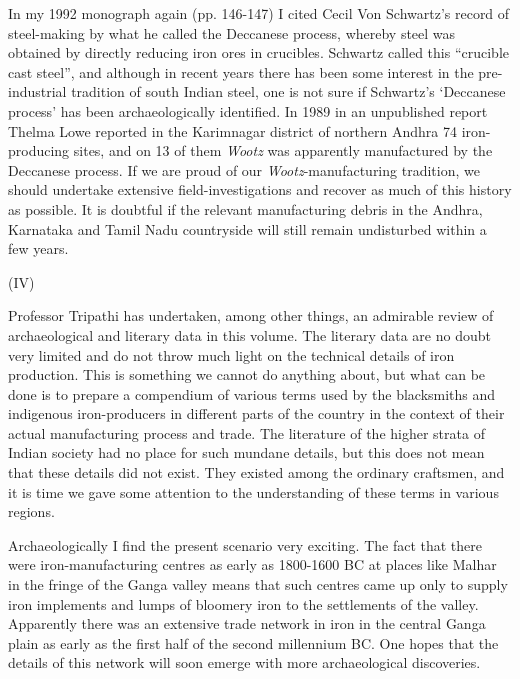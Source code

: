 In my 1992 monograph again (pp. 146-147) I cited Cecil Von Schwartz's record of steel-making by what he called the Deccanese process, whereby steel was obtained by directly reducing iron ores in crucibles. Schwartz called this ``crucible cast steel'', and although in recent years there has been some interest in the pre-industrial tradition of south Indian steel, one is not sure if Schwartz's `Deccanese process' has been archaeologically identified. In 1989 in an unpublished report Thelma Lowe reported in the Karimnagar district of northern Andhra 74 iron-producing sites, and on 13 of them \textit{Wootz} was apparently manufactured by the Deccanese process. If we are proud of our \textit{Wootz}-manufacturing tradition, we should undertake extensive field-investigations and recover as much of this history as possible. It is doubtful if the relevant manufacturing debris in the Andhra, Karnataka and Tamil Nadu countryside will still remain undisturbed within a few years.

\begin{center}
(IV)
\end{center}

Professor Tripathi has undertaken, among other things, an admirable review of archaeological and literary data in this volume. The literary data are no doubt very limited and do not throw much light on the technical details of iron production. This is something we cannot do anything about, but what can be done is to prepare a compendium of various terms used by the blacksmiths and indigenous iron-producers in different parts of the country in the context of their actual manufacturing process and trade. The literature of the higher strata of Indian society had no place for such mundane details, but this does not mean that these details did not exist. They existed among the ordinary craftsmen, and it is time we gave some attention to the understanding of these terms in various regions.

Archaeologically I find the present scenario very exciting. The fact that there were iron-manufacturing centres as early as 1800-1600 BC at places like Malhar in the fringe of the Ganga valley means that such centres came up only to supply iron implements and lumps of bloomery iron to the settlements of the valley. Apparently there was an extensive trade network in iron in the central Ganga plain as early as the first half of the second millennium BC. One hopes that the details of this network will soon emerge with more archaeological discoveries.

